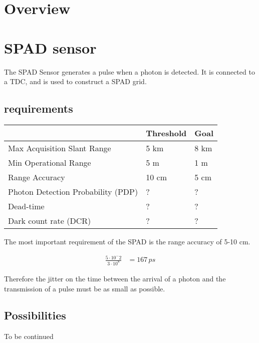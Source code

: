 \section{Overview} 
\label{sec:overview}



\section{SPAD sensor} 
\label{sec:spad_sensor}
The SPAD Sensor generates a pulse when a photon is detected. It is connected to a TDC, and is used to construct a SPAD grid.

\subsection{requirements} 
\label{ssec:sensor_req}

\begin{table}[H]
    \begin{tabular}{l|l|l}
    ~                                  & Threshold & Goal \\ \hline
    Max Acquisition Slant Range        & 5 km      & 8 km \\
    Min Operational Range              & 5 m       & 1 m  \\
    Range Accuracy                     & 10 cm     & 5 cm \\
    Photon Detection Probability (PDP) & ?         & ?    \\
    Dead-time                          & ?         & ?    \\
    Dark count rate (DCR)              & ?         & ?    \\
    \end{tabular}
\end{table}

The most important requirement of the SPAD is the range accuracy of 5-10 cm. 

\begin{align*}
	\frac{5\cdot10^-2}{3\cdot10^8} &= 167\, ps 
\end{align*}

Therefore the jitter on the time between the arrival of a photon and the transmission of a pulse must be as small as possible.

\subsection{Possibilities} 
\label{ssec:sensor_pos}
To be continued

